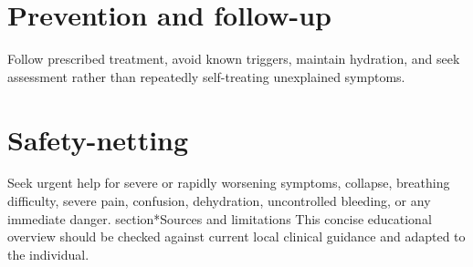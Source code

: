 \section*{Prevention and follow-up}
Follow prescribed treatment, avoid known triggers, maintain hydration, and seek assessment rather than repeatedly self-treating unexplained symptoms.
\section*{Safety-netting}
Seek urgent help for severe or rapidly worsening symptoms, collapse, breathing difficulty, severe pain, confusion, dehydration, uncontrolled bleeding, or any immediate danger.
section*{Sources and limitations}
This concise educational overview should be checked against current local clinical guidance and adapted to the individual.

